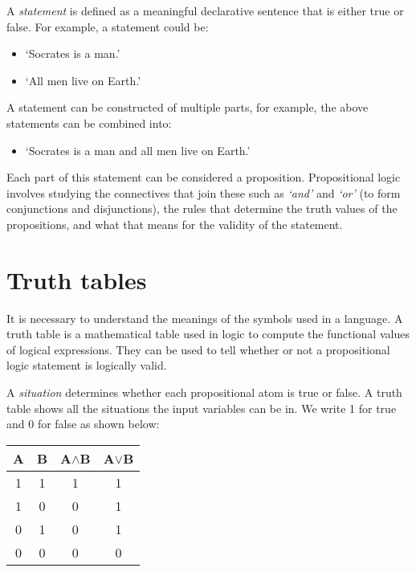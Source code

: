 \documentclass{report}
\begin{document}
A \textit{statement} is defined as a meaningful declarative sentence that is either true or false. For example, a statement could be: 

\begin{itemize}
\item `Socrates is a man.'
\item `All men live on Earth.'
\end{itemize}
A statement can be constructed of multiple parts, for example, the above statements can be combined into:

\begin{itemize}
\item `Socrates is a man and all men live on Earth.'
\end{itemize}
Each part of this statement can be considered a proposition. Propositional logic involves studying the connectives that join these such as \textit{`and'} and \textit{`or'} (to form conjunctions and disjunctions), the rules that determine the truth values of the propositions, and what that means for the validity of the statement.

\section{Truth tables}

It is necessary to understand the meanings of the symbols used in a language. A truth table is a mathematical table used in logic to compute the functional values of logical expressions. They can be used to tell whether or not a propositional logic statement is logically valid.

A \textit{situation} determines whether each propositional atom is true or false. A truth table shows all the situations the input variables can be in. We write 1 for true and 0 for false as shown below:

\vspace{5 mm}
\begin{center}
  \begin{tabular}{ || c | c || c | c || }
    \hline
    A & B & A$\land$B & A$\lor$B \\ \hline
    1 & 1 & 1 & 1 \\
    1 & 0 & 0 & 1\\
    0 & 1 & 0 & 1 \\
    0 & 0 & 0 & 0 \\
    \hline
  \end{tabular}
\end{center}
\vspace{5 mm}
\end{document}
